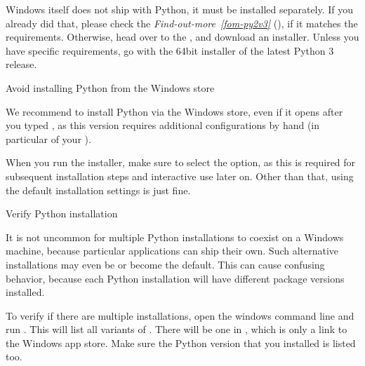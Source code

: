 \begin{description}
\ignorespaces 
\sphinxAtStartPar
Windows itself does not ship with Python, it must be installed separately.
If you already did that, please check the \textit{Find-out-more}~{\findoutmoreiconinline}\textit{\ref{fom-py2v3}} {\hyperref[\detokenize{intro/installation:fom-py2v3}]{}} (), if it matches the requirements. Otherwise, head over
to the , and download an installer. Unless you
have specific requirements, go with the 64bit installer of the latest
Python 3 release.
\begin{windowswit}[before title={\thetcbcounter\ }, check odd page=true]{Avoid installing Python from the Windows store}

\sphinxAtStartPar
We recommend to  install Python via the Windows store, even if it
opens after you typed , as this version requires
additional configurations by hand (in particular of your 
{\hyperref[\detokenize{glossary:term-environment-variable}]{}}).


\end{windowswit}

\sphinxAtStartPar
When you run the installer, make sure to select the  option,
as this is required for subsequent installation steps and interactive use later on.
Other than that, using the default installation settings is just fine.
\begin{windowswit}[before title={\thetcbcounter\ }, check odd page=true]{Verify Python installation}

\sphinxAtStartPar
It is not uncommon for multiple Python installations to co\sphinxhyphen{}exist on a Windows machine, because particular applications can ship their own.
Such alternative installations may even be or become the default.
This can cause confusing behavior, because each Python installation will have different package versions installed.

\sphinxAtStartPar
To verify if there are multiple installations, open the windows command line  and run .
This will list all variants of .
There will be one in , which is only a link to the Windows app store.
Make sure the Python version that you installed is listed too.


\end{windowswit}
\end{description}
